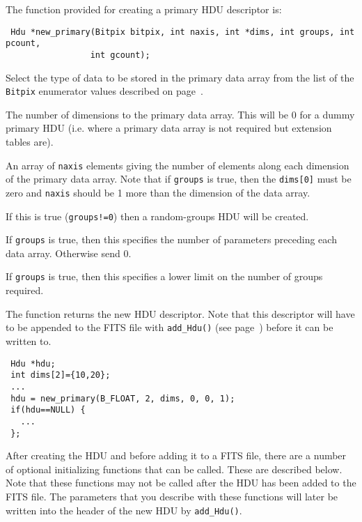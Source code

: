The function provided for creating a primary HDU descriptor is:
\label{new_primary}\begin{verbatim}
 Hdu *new_primary(Bitpix bitpix, int naxis, int *dims, int groups, int pcount,
                 int gcount);
\end{verbatim}
\begin{arglist}
 Select the type of data to be stored in the primary data
            array from the list of the \verb`Bitpix` enumerator values
            described on page~\pageref{Bitpix}.

 The number of dimensions to the primary data array.
            This will be 0 for a dummy primary HDU (i.e. where a primary
            data array is not required but extension tables are).

 An array of \verb`naxis` elements giving the number
            of elements along each dimension of the primary data array.
            Note that if \verb`groups` is true, then the \verb`dims[0]`
            must be zero and \verb`naxis` should be 1 more than the
            dimension of the data array.

 If this is true (\verb`groups!=0`) then a random-groups
            HDU will be created.

 If \verb`groups` is true, then this specifies the number
            of parameters preceding each data array. Otherwise
            send 0.

 If \verb`groups` is true, then this specifies a lower
            limit on the number of groups required.
\end{arglist}

The function returns the new HDU descriptor. Note that this descriptor
will have to be appended to the FITS file with \verb`add_Hdu()` (see
page~\pageref{add_Hdu}) before it can be written to.

\begin{verbatim}
 Hdu *hdu;
 int dims[2]={10,20};
 ...
 hdu = new_primary(B_FLOAT, 2, dims, 0, 0, 1);
 if(hdu==NULL) {
   ...
 };
\end{verbatim}
After creating the HDU and before adding it to a FITS file, there are
a number of optional initializing functions that can be called. These are
described below. Note that these functions may not be called after the
HDU has been added to the FITS file. The parameters that you describe
with these functions will later be written into the header of the new
HDU by \verb`add_Hdu()`.

